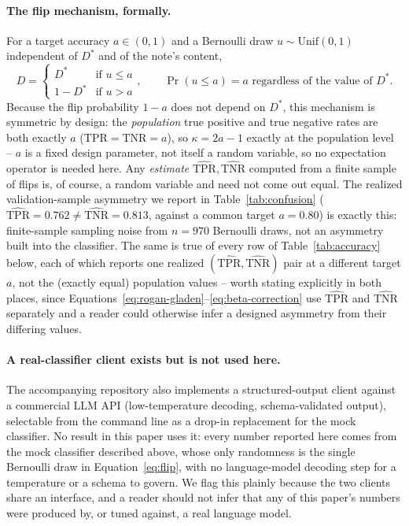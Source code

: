 \documentclass[12pt]{article}
\begin{document}
\paragraph{The flip mechanism, formally.} For a target accuracy $a \in (0,1)$ and a Bernoulli draw $u \sim \mathrm{Unif}(0,1)$ independent of $D^{*}$ and of the note's content,
\begin{equation}
D = \begin{cases} D^{*} & \text{if } u \le a \\ 1-D^{*} & \text{if } u > a \end{cases}, \qquad \Pr(u \le a) = a \text{ regardless of the value of } D^{*}.
\label{eq:flip}
\end{equation}
Because the flip probability $1-a$ does not depend on $D^{*}$, this mechanism is symmetric by design: the \emph{population} true positive and true negative rates are both exactly $a$ ($\mathrm{TPR}=\mathrm{TNR}=a$), so $\kappa = 2a-1$ exactly at the population level -- $a$ is a fixed design parameter, not itself a random variable, so no expectation operator is needed here. Any \emph{estimate} $\widehat{\mathrm{TPR}}, \widehat{\mathrm{TNR}}$ computed from a finite sample of flips is, of course, a random variable and need not come out equal. The realized validation-sample asymmetry we report in Table~\ref{tab:confusion} ($\widehat{\mathrm{TPR}}=0.762 \ne \widehat{\mathrm{TNR}}=0.813$, against a common target $a=0.80$) is exactly this: finite-sample sampling noise from $n=970$ Bernoulli draws, not an asymmetry built into the classifier. The same is true of every row of Table~\ref{tab:accuracy} below, each of which reports one realized $(\widehat{\mathrm{TPR}}, \widehat{\mathrm{TNR}})$ pair at a different target $a$, not the (exactly equal) population values -- worth stating explicitly in both places, since Equations~\ref{eq:rogan-gladen}--\ref{eq:beta-correction} use $\widehat{\mathrm{TPR}}$ and $\widehat{\mathrm{TNR}}$ separately and a reader could otherwise infer a designed asymmetry from their differing values.

\paragraph{A real-classifier client exists but is not used here.} The accompanying repository also implements a structured-output client against a commercial LLM API (low-temperature decoding, schema-validated output), selectable from the command line as a drop-in replacement for the mock classifier. No result in this paper uses it: every number reported here comes from the mock classifier described above, whose only randomness is the single Bernoulli draw in Equation~\ref{eq:flip}, with no language-model decoding step for a temperature or a schema to govern. We flag this plainly because the two clients share an interface, and a reader should not infer that any of this paper's numbers were produced by, or tuned against, a real language model.
\end{document}
